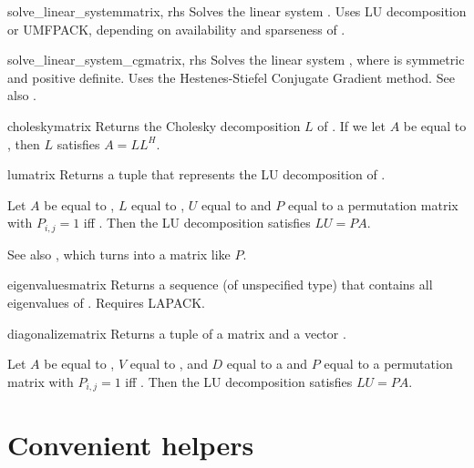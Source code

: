 \begin{funcdesc}{solve_linear_system}{matrix, rhs}
  Solves the linear system . Uses LU
  decomposition or UMFPACK, depending on availability and sparseness
  of .
\end{funcdesc}
\begin{funcdesc}{solve_linear_system_cg}{matrix, rhs}
  Solves the linear system , where  is
  symmetric and positive definite. Uses the Hestenes-Stiefel Conjugate
  Gradient method. See also .
\end{funcdesc}
\begin{funcdesc}{cholesky}{matrix}
  Returns the Cholesky decomposition $L$ of . If we let $A$
  be equal to , then $L$ satisfies $A=L L^H$.
\end{funcdesc}
\begin{funcdesc}{lu}{matrix}
  Returns a tuple  that represents the LU
  decomposition of .

  Let $A$ be equal to , $L$ equal to , $U$ equal
  to  and $P$ equal to a permutation matrix with $P_{i,j}=1$
  iff . Then the LU decomposition satisfies $LU=PA$.

  See also , which turns 
  into a matrix like $P$.
\end{funcdesc}
\begin{funcdesc}{eigenvalues}{matrix}
  Returns a sequence (of unspecified type) that contains all eigenvalues
  of . Requires LAPACK.
\end{funcdesc}
\begin{funcdesc}{diagonalize}{matrix}
  Returns a tuple  of a matrix  and a vector .

  Let $A$ be equal to , $V$ equal to , and $D$ equal
  to a  and $P$ equal to a permutation matrix with $P_{i,j}=1$
  iff . Then the LU decomposition satisfies $LU=PA$.
\end{funcdesc}


\section{Convenient helpers}

